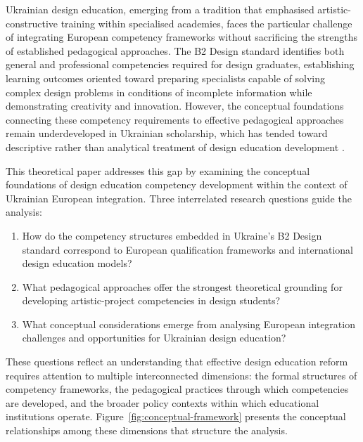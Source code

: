 \documentclass[ed]{acnsart}
\begin{document}
	Ukrainian design education, emerging from a tradition that emphasised artistic-constructive training within specialised academies, faces the particular challenge of integrating European competency frameworks without sacrificing the strengths of established pedagogical approaches. The B2 Design standard identifies both general and professional competencies required for design graduates, establishing learning outcomes oriented toward preparing specialists capable of solving complex design problems in conditions of incomplete information while demonstrating creativity and innovation. However, the conceptual foundations connecting these competency requirements to effective pedagogical approaches remain underdeveloped in Ukrainian scholarship, which has tended toward descriptive rather than analytical treatment of design education development \cite{Fursa2014}.
	
	This theoretical paper addresses this gap by examining the conceptual foundations of design education competency development within the context of Ukrainian European integration. Three interrelated research questions guide the analysis:
	
	\begin{enumerate}[label=\textbf{RQ\arabic*:}, leftmargin=*]
		\item How do the competency structures embedded in Ukraine's B2 Design standard correspond to European qualification frameworks and international design education models?
		\item What pedagogical approaches offer the strongest theoretical grounding for developing artistic-project competencies in design students?
		\item What conceptual considerations emerge from analysing European integration challenges and opportunities for Ukrainian design education?
	\end{enumerate}
	
	These questions reflect an understanding that effective design education reform requires attention to multiple interconnected dimensions: the formal structures of competency frameworks, the pedagogical practices through which competencies are developed, and the broader policy contexts within which educational institutions operate. Figure~\ref{fig:conceptual-framework} presents the conceptual relationships among these dimensions that structure the analysis.
	
\end{document}
